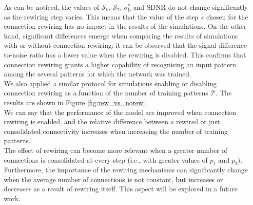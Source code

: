 \documentclass[a4paper, 12pt, twoside, openright]{book}
\newcommand{\T}{\mathcal{T}}
\newcommand{\SII}{\mathcal{S}_\text{2}}
\newcommand{\Sb}{\mathcal{S}_\text{b}}
\newcommand{\varSb}{\sigma^{2}_\text{b}}
\begin{document}
As can be noticed, the values of $\Sb$, $\SII$, $\varSb$ and SDNR do not change significantly as the rewiring step varies.
This means that the value of the step $s$ chosen for the connection rewiring has no impact in the results of the simulations.
On the other hand, significant differences emerge when comparing the results of simulations
with or without connection rewiring; it can be observed that the signal-difference-to-noise ratio has a lower value  when the rewiring is disabled. This confirms that connection rewiring grants a higher capability of recognising an input pattern among the several patterns
for which the network was trained.\\
We also applied a similar protocol for simulations enabling or disabling connection rewiring as a function of the number of training patterns $\T$. The results are shown in Figure \ref{fig:rew_vs_norew}.\\
We can say that the performance of the model are improved when connection rewiring is enabled, and the relative difference between a rewired or just consolidated connectivity increases when increasing the number of training patterns.\\
The effect of rewiring can become more relevant when a greater number of connections is consolidated at every step (i.e., with greater values of $p_1$ and $p_2$).
Furthermore, the importance of the rewiring mechanisms can significantly change 
when the average number of connections is not constant, but increases or decreases as a result of rewiring itself. This aspect will be explored in a future work.
\end{document}
